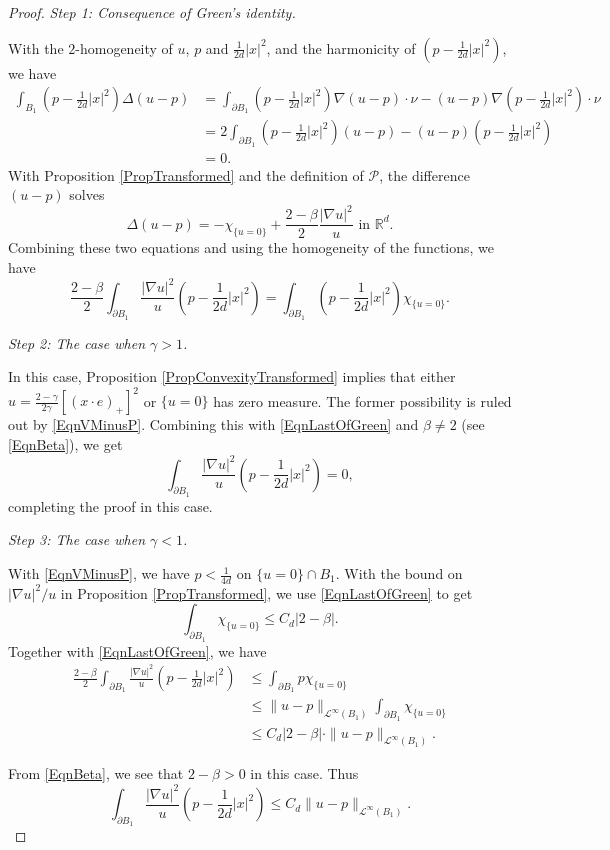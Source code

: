 \documentclass{amsart}
\def\R {\mathbb{R}}
\def\Diri{|\nabla u|^2}
\def\P{\mathcal{P}}
\def\vem{\vspace{0.6em}}
\theoremstyle{definition}
\numberwithin{equation}{section}
\theoremstyle{remark}
\begin{document}
\begin{proof}
\textit{Step 1: Consequence of Green's identity.}

With the $2$-homogeneity of  $u$, $p$ and $\frac{1}{2d}|x|^2$, and the harmonicity of $(p-\frac{1}{2d}|x|^2)$, we have
\begin{align*}
\int_{B_1}(p-\frac{1}{2d}|x|^2)\Delta(u-p)&=\int_{\partial B_1}(p-\frac{1}{2d}|x|^2)\nabla(u-p)\cdot\nu-(u-p)\nabla(p-\frac{1}{2d}|x|^2)\cdot\nu\\
&=2\int_{\partial B_1}(p-\frac{1}{2d}|x|^2)(u-p)-(u-p)(p-\frac{1}{2d}|x|^2)\\
&=0.
\end{align*}
With Proposition \ref{PropTransformed} and the definition of $\P$, the difference $(u-p)$ solves
\begin{equation}
\label{EqnLaplacianVMinusP}
\Delta(u-p)=-\chi_{\{u=0\}}+\frac{2-\beta}{2}\frac{|\nabla u|^2}{u} \text{ in }\R^d.
\end{equation}
Combining these two equations and using the homogeneity of the functions, we have
\begin{equation}
\label{EqnLastOfGreen}
\frac{2-\beta}{2}\int_{\partial B_1}\frac{|\nabla u|^2}{u}(p-\frac{1}{2d}|x|^2)=\int_{\partial B_1}(p-\frac{1}{2d}|x|^2)\chi_{\{u=0\}}.
\end{equation}

\vem

\textit{Step 2: The case when $\gamma>1$.}

In this case, Proposition \ref{PropConvexityTransformed} implies that either $u=\frac{2-\gamma}{2\gamma}[(x\cdot e)_+]^2$  or $\{u=0\}$ has zero measure. The former possibility is ruled out by \eqref{EqnVMinusP}. Combining this with \eqref{EqnLastOfGreen} and  $\beta\neq2$ (see \eqref{EqnBeta}), we get
$$
\int_{\partial B_1}\frac{|\nabla u|^2}{u}(p-\frac{1}{2d}|x|^2)=0,
$$
completing the proof in this case. 

\vem

\textit{Step 3: The case when $\gamma<1$.}

With \eqref{EqnVMinusP}, we have $p<\frac{1}{4d}$ on $\{u=0\}\cap B_1$. With the bound on $\Diri/u$ in Proposition \ref{PropTransformed}, we use \eqref{EqnLastOfGreen} to get
$$
\int_{\partial B_1}\chi_{\{u=0\}}\le C_d|2-\beta|.
$$
Together with \eqref{EqnLastOfGreen}, we have
\begin{align*}
\frac{2-\beta}{2}\int_{\partial B_1}\frac{|\nabla u|^2}{u}(p-\frac{1}{2d}|x|^2)&\le\int_{\partial B_1}p\chi_{\{u=0\}}\\
&\le\|u-p\|_{\mathcal{L}^\infty(B_1)}\int_{\partial B_1}\chi_{\{u=0\}}\\
&\le C_d |2-\beta|\cdot\|u-p\|_{\mathcal{L}^\infty(B_1)}.
\end{align*}

From \eqref{EqnBeta}, we see that $2-\beta>0$ in this case. Thus
$$
\int_{\partial B_1}\frac{|\nabla u|^2}{u}(p-\frac{1}{2d}|x|^2)\le C_d\|u-p\|_{\mathcal{L}^\infty(B_1)}.
$$
\end{proof} 
\end{document}
